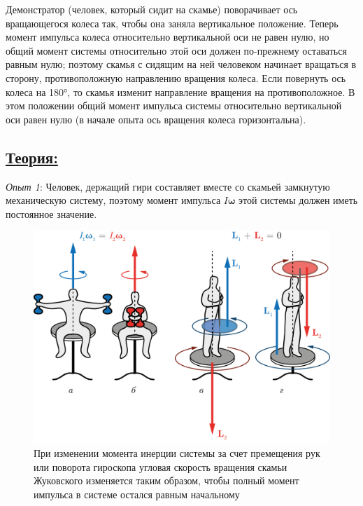 \documentclass[14pt,a4paper,oneside]{extarticle}	%
\begin{document}
Демонстратор (человек, который сидит на скамье) поворачивает ось вращающегося колеса так, чтобы она заняла вертикальное положение. 
Теперь момент импульса колеса относительно вертикальной оси не равен нулю, но общий момент системы относительно этой оси должен по-прежнему оставаться равным нулю; поэтому скамья с сидящим на ней человеком начинает вращаться в сторону, противоположную направлению вращения колеса.
Если повернуть ось колеса на 180°, то скамья изменит направление вращения на противоположное.
В этом положении общий момент импульса системы относительно вертикальной оси равен нулю (в начале опыта ось вращения колеса  горизонтальна).
	
	\subsection*{\underline{Теория:}}
	
\textit{Опыт 1}:
 Человек, держащий гири составляет вместе со скамьей замкнутую механическую систему, поэтому момент импульса $ I\bm{\omega} $ этой системы должен иметь постоянное значение.
 	\begin{figure}[H] 	
 	\centering 	
 	\includegraphics[width=0.9\linewidth]{chair-2.png}
 	\caption{При изменении момента инерции системы за счет премещения рук или поворота гироскопа угловая скорость вращения скамьи Жуковского изменяется таким образом, чтобы полный момент импульса в системе остался равным начальному}
 	\label{chair-2}
 \end{figure}
\end{document}

